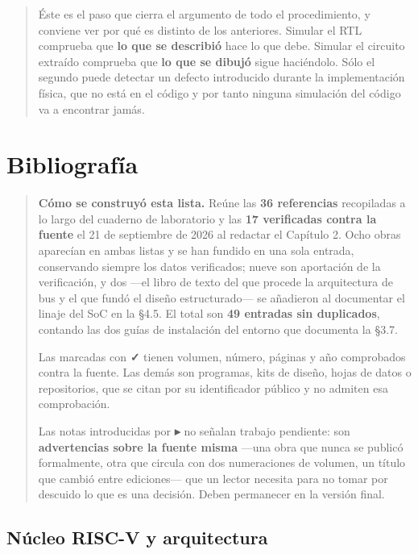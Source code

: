 \begin{quote}
Éste es el paso que cierra el argumento de todo el procedimiento, y
conviene ver por qué es distinto de los anteriores. Simular el RTL
comprueba que \textbf{lo que se describió} hace lo que debe. Simular el
circuito extraído comprueba que \textbf{lo que se dibujó} sigue
haciéndolo. Sólo el segundo puede detectar un defecto introducido
durante la implementación física, que no está en el código y por tanto
ninguna simulación del código va a encontrar jamás.
\end{quote}

\chapter{Bibliografía}\label{bibliografuxeda}

\begin{quote}
\textbf{Cómo se construyó esta lista.} Reúne las \textbf{36 referencias}
recopiladas a lo largo del cuaderno de laboratorio y las \textbf{17
verificadas contra la fuente} el 21 de septiembre de 2026 al redactar el
Capítulo 2. Ocho obras aparecían en ambas listas y se han fundido en una
sola entrada, conservando siempre los datos verificados; nueve son
aportación de la verificación, y dos ---el libro de texto del que
procede la arquitectura de bus y el que fundó el diseño estructurado---
se añadieron al documentar el linaje del SoC en la §4.5. El total son
\textbf{49 entradas sin duplicados}, contando las dos guías de
instalación del entorno que documenta la §3.7.

Las marcadas con \textbf{✓} tienen volumen, número, páginas y año
comprobados contra la fuente. Las demás son programas, kits de diseño,
hojas de datos o repositorios, que se citan por su identificador público
y no admiten esa comprobación.

Las notas introducidas por \textbf{▸} no señalan trabajo pendiente: son
\textbf{advertencias sobre la fuente misma} ---una obra que nunca se
publicó formalmente, otra que circula con dos numeraciones de volumen,
un título que cambió entre ediciones--- que un lector necesita para no
tomar por descuido lo que es una decisión. Deben permanecer en la
versión final.
\end{quote}

\section{Núcleo RISC-V y
arquitectura}\label{nuxfacleo-risc-v-y-arquitectura}

